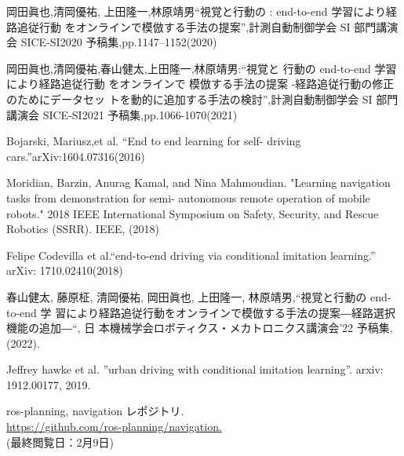 \documentclass{jarticle}
\begin{document}


\footnotesize
\begin{thebibliography}{99}



岡田眞也,清岡優祐, 上田隆一,林原靖男“視覚と行動の : end-to-end 学習により経路追従行動 をオンラインで模倣する手法の提案”,計測自動制御学会 SI 部門講演会 SICE-SI2020 予稿集,pp.1147–1152(2020)

岡田眞也,清岡優祐,春山健太,上田隆一,林原靖男:“視覚と 行動の end-to-end 学習により経路追従行動 をオンラインで 模倣する手法の提案 -経路追従行動の修正のためにデータセッ トを動的に追加する手法の検討”,計測自動制御学会 SI 部門 講演会 SICE-SI2021 予稿集,pp.1066-1070(2021)

Bojarski, Mariusz,et al. “End to end learning for self- driving cars.”arXiv:1604.07316(2016)

Moridian, Barzin, Anurag Kamal, and Nina Mahmoudian. "Learning navigation tasks from demonstration for semi- autonomous remote operation of mobile robots." 2018 IEEE International Symposium on Safety, Security, and Rescue Robotics (SSRR). IEEE, (2018)

Felipe Codevilla et al.“end-to-end driving via conditional imitation learning.” arXiv: 1710.02410(2018)

春山健太, 藤原柾, 清岡優祐, 岡田眞也, 上田隆一, 林原靖男,“視覚と行動の end-to-end 学 習により経路追従行動をオンラインで模倣する手法の提案―経路選択機能の追加―“, 日 本機械学会ロボティクス・メカトロニクス講演会’22 予稿集,(2022).

Jeffrey hawke et al. ”urban driving with conditional imitation learning”. arxiv: 1912.00177, 2019.

ros-planning, navigation レポジトリ. \\\url{https://github.com/ros-planning/navigation.}\\
(最終閲覧日：2月9日)


\end{thebibliography}
\end{document}
